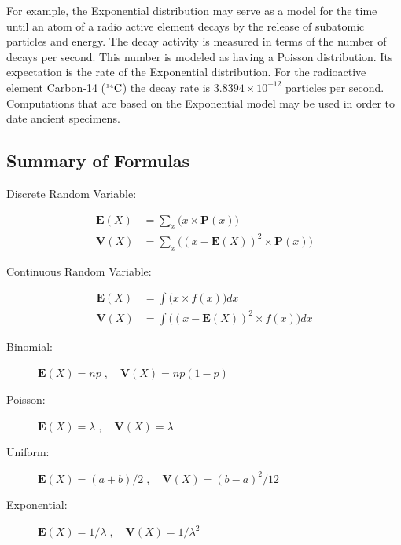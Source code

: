 \documentclass[]{krantz}
\newcommand{\Expec}{\mathbf{E}}
\newcommand{\Prob}{\mathbf{P}}
\newcommand{\Var}{\mathbf{V}}
\theoremstyle{definition}
\theoremstyle{definition}
\theoremstyle{definition}
\theoremstyle{remark}
\begin{document}
For example, the Exponential distribution may serve as a model for the
time until an atom of a radio active element decays by the release of
subatomic particles and energy. The decay activity is measured in terms
of the number of decays per second. This number is modeled as having a
Poisson distribution. Its expectation is the rate of the Exponential
distribution. For the radioactive element Carbon-14
(\({}^{\mbox{\tiny 14}}\mathrm{C}\)) the decay rate is
\(3.8394 \times 10^{-12}\) particles per second. Computations that are
based on the Exponential model may be used in order to date ancient
specimens.

\hypertarget{summary-of-formulas}{%
\subsection*{Summary of Formulas}\label{summary-of-formulas}}


\begin{description}
\item[Discrete Random Variable:]
\end{description}

\[\begin{aligned}
        \Expec(X) &= \sum_x \big(x \times \Prob(x)\big) \\
        \Var(X) &= \sum_x\big( (x-\Expec(X))^2 \times \Prob(x)\big) \end{aligned}\]

\begin{description}
\item[Continuous Random Variable:]
\end{description}

\[\begin{aligned}
        \Expec(X) &= \int \big(x \times f(x)\big)dx \\
        \Var(X) &= \int\big((x-\Expec(X))^2 \times f(x) \big) dx \end{aligned}\]

\begin{description}
\item[Binomial:]
\(\Expec(X) = n p \;, \quad \Var(X) = n p(1-p)\)
\item[Poisson:]
\(\Expec(X) = \lambda\;, \quad \Var(X) = \lambda\)
\item[Uniform:]
\(\Expec(X) = (a+b)/2\;, \quad \Var(X)= (b-a)^2/12\)
\item[Exponential:]
\(\Expec(X) = 1/\lambda\;, \quad \Var(X)= 1/\lambda^2\)
\end{description}
\end{document}
